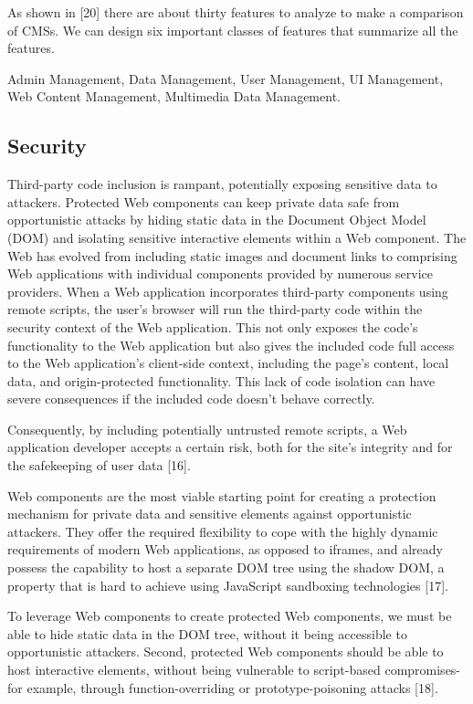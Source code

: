 \documentclass{sig-alternate}
\begin{document}
As shown in [20] there are about thirty features to analyze to make a comparison of CMSs. We can design six important classes of features that summarize all the features.

Admin Management, Data Management, User Management, UI Management, Web Content Management, Multimedia Data Management.

\subsection{Security}

Third-party code inclusion is rampant, potentially exposing sensitive data to attackers. Protected Web components can keep private data safe from opportunistic attacks by hiding static data in the Document Object Model (DOM) and isolating sensitive interactive elements within a Web component.
The Web has evolved from including static images and document links to comprising Web applications with individual components provided by numerous service providers. When a Web application incorporates third-party components using remote scripts, the user's browser will run the third-party code within the security context of the Web application. This not only exposes the code's functionality to the Web application but also gives the included code full access to the Web application's client-side context, including the page's content, local data, and origin-protected functionality. 
This lack of code isolation can have severe consequences if the included code doesn't behave correctly.

Consequently, by including potentially untrusted remote scripts, a Web application developer accepts a certain risk, both for the site's integrity and for the safekeeping of user data [16].

Web components are the most viable starting point for creating a protection mechanism for private data and sensitive elements against opportunistic attackers. They offer the required flexibility to cope with the highly dynamic requirements of modern Web applications, as opposed to iframes, and already possess the capability to host a separate DOM tree using the shadow DOM, a property that is hard to achieve using JavaScript sandboxing technologies [17].

To leverage Web components to create protected Web components, we must be able to hide static data in the DOM tree, without it being accessible to opportunistic attackers. Second, protected Web components should be able to host interactive elements, without being vulnerable to script-based compromises-for example, through function-overriding or prototype-poisoning attacks [18].
\end{document}
